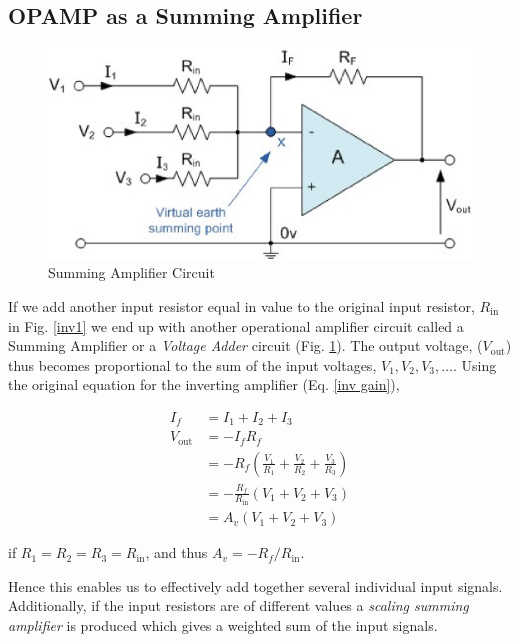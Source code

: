 \subsection{OPAMP as a Summing Amplifier}

\begin{figure}[H]
    \centering
    \includegraphics[width=0.8\columnwidth]{images/sum1.png}
    \caption{Summing Amplifier Circuit}
    \label{sum1}
\end{figure}

If we add another input resistor equal in value to the original input resistor, $R_\text{in}$ in Fig. \ref{inv1} we end up with another operational amplifier circuit called a Summing Amplifier or a \textit{Voltage Adder} circuit (Fig. \ref{sum1}). The output voltage, ($V_\text{out}$) thus becomes proportional to the sum of the input voltages, $V_1, V_2, V_3, \dots$. Using the original equation for the inverting amplifier (Eq. \ref{inv gain}),

\begin{align}
    I_f &= I_1 + I_2 + I_3 \nonumber \\
    V_\text{out} &= -I_f R_f \nonumber \\
    &= -R_f \left(\frac{V_1}{R_1} + \frac{V_2}{R_2} + \frac{V_3}{R_3}\right) \nonumber \\
    &= -\frac{R_f}{R_\text{in}} (V_1 + V_2 + V_3) \nonumber \\
    &= A_v (V_1 + V_2 + V_3)
\end{align}

if $R_1 = R_2 = R_3 = R_\text{in}$, and thus $A_v=-R_f/R_\text{in}$.

Hence this enables us to effectively add together several individual input signals. Additionally, if the input resistors are of different values a \textit{scaling summing amplifier} is produced which gives a weighted sum of the input signals.


